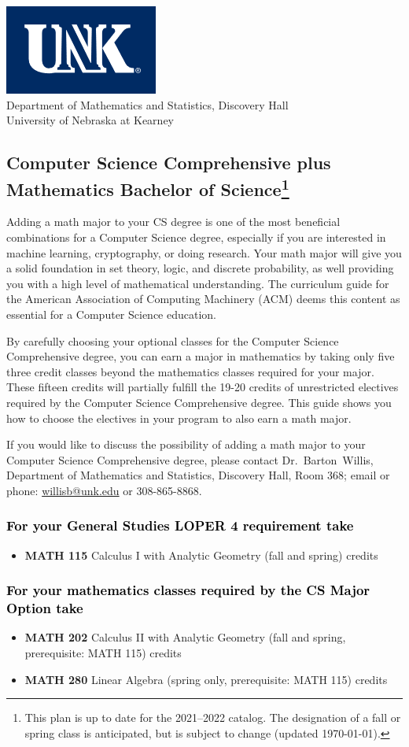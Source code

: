 \documentclass[10pt]{article}
\makeatletter
\newcommand{\calcone}{\textbf{MATH 115} Calculus I with Analytic Geometry (fall and spring) \dotfill 5 credits}
\newcommand{\calctwo}{\textbf{MATH 202} Calculus II with Analytic Geometry (fall and spring, prerequisite: MATH 115) \dotfill 5 credits }
\newcommand{\linear}{\textbf{MATH 280} Linear Algebra (spring only, prerequisite: MATH 115) \dotfill 3 credits}
\newcommand{\contactbw}{\mbox{Dr.\ Barton Willis}, Department of Mathematics and Statistics,  Discovery Hall, Room 368;
email or phone: \href{mailto:willisb@unk.edu}{willisb@unk.edu} or 308-865-8868.}
\newcommand{\forinfo}[2]{If you would like to discuss the possibility of adding a math {#1} to your {#2}, please contact \contactbw}
\newcommand{\catalog}{2021--2022 }
\newcommand{\myfootnote}{\footnote{This plan is up to date for  the \catalog catalog. The designation of a fall or spring class is 
anticipated, but  is subject to change (updated  \today).}}
\newcommand{\myheading}{
\begin{flushleft}
\includegraphics[scale=0.35]{unk-logo}\\
\setcounter{footnote}{0}
\vspace{0.25in}
 \textcolor{unkblue}{Department of Mathematics and Statistics, Discovery Hall} \\
  \textcolor{unkblue}{University of Nebraska at Kearney}
\end{flushleft}}
\makeatother
\begin{document}
\myheading



\vspace{-0.1in}
\subsection*{\textbf{\textcolor{unkblue}{Computer Science Comprehensive plus Mathematics Bachelor of Science\myfootnote}}}

Adding a math major to your CS degree is one of the most beneficial combinations for a Computer Science degree, especially if you are interested in machine learning, cryptography,   or doing research.  Your math major  will give you a solid foundation in set theory, logic, and discrete probability, as well providing you with a high level of mathematical understanding.  The curriculum guide for the American Association of Computing Machinery (ACM) deems  this content  as essential for  a Computer Science education.

By carefully choosing your optional classes for the Computer Science Comprehensive degree, you can earn a major in mathematics by taking only five three credit classes beyond the mathematics classes required for your major.  These fifteen credits will partially fulfill the 19-20 credits of unrestricted electives required by the Computer Science Comprehensive degree. This guide shows you how to choose the electives in your program to also earn a math major.


\forinfo{major}{Computer Science Comprehensive degree}


\subsubsection*{\textcolor{black}{For  your General Studies LOPER 4 requirement take}}
\begin{itemize}
\item \calcone
\end{itemize}


\subsubsection*{\textcolor{black}{For your mathematics classes required by the CS Major Option take}}
\begin{itemize}
\item \calctwo
\item \linear
\end{itemize}
\end{document}
